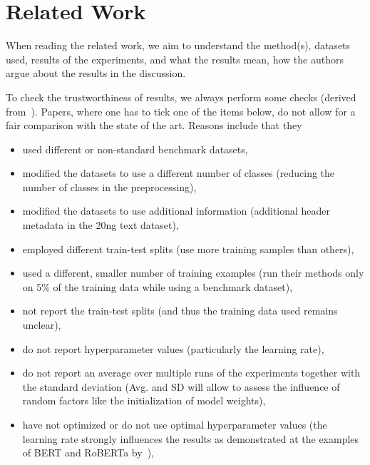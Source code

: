 \documentclass[sigconf, review, nonacm]{acmart}
\begin{document}
\section{Related Work}
\label{sec:relatedwork}

When reading the related work, we aim to understand the method(s), datasets used, results of the experiments, and what the results mean, \ie how the authors argue about the results in the discussion.

\begin{tcolorbox}[title=Instructions]
To check the trustworthiness of results, we always perform some checks (derived from~\cite{DBLP:journals/corr/abs-2204-03954v5-textclassification}).
%
Papers, where one has to tick one of the items below, do not allow for a fair comparison with the state of the art.
Reasons include that they 

\begin{itemize}
\item used different or non-standard benchmark datasets,

\item modified the datasets to use a different number of classes (\ie reducing the number of classes in the preprocessing),

\item modified the datasets to use additional information (\eg additional header metadata in the 20ng text dataset),

\item employed different train-test splits (\eg use more training samples than others), 

\item used a different, smaller number of training examples (\eg run their methods only on 5\% of the training data while using a benchmark dataset),

\item not report the train-test splits (and thus the training data used remains unclear),

\item do not report hyperparameter values (particularly the learning rate), 

\item do not report an average over multiple runs of the experiments together with the standard deviation (Avg. and SD will allow to assess the influence of random factors like the initialization of model weights),  

\item have not optimized or do not use optimal hyperparameter values (\eg the learning rate strongly influences the results as demonstrated at the examples of BERT and RoBERTa by~\citet{DBLP:journals/corr/abs-2204-03954v5-textclassification}), 


\end{itemize}
\end{tcolorbox}
\end{document}
